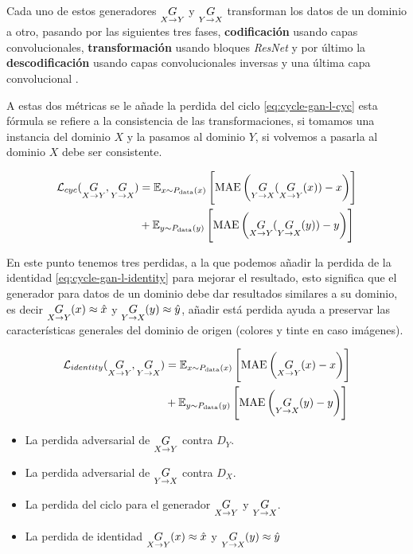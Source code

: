 Cada uno de estos generadores ${\underset{X\rightarrow{}Y}{G}}$ y ${\underset{Y\rightarrow{}X}{G}}$ transforman los datos de un dominio a otro, pasando por las siguientes tres fases, \textbf{codificación} usando capas convolucionales, \textbf{transformación} usando bloques \textit{ResNet} y por último la \textbf{descodificación} usando capas convolucionales inversas y una última capa convolucional \cite{CycleGAN-blog}.

A estas dos métricas se le añade la perdida del ciclo \ref{eq:cycle-gan-l-cyc} esta fórmula se refiere a la consistencia de las transformaciones, si tomamos una instancia del dominio ${X}$ y la pasamos al dominio ${Y}$, si volvemos a pasarla al dominio ${X}$ debe ser consistente.

\begin{equation}
    \begin{split}
        \mathcal{L}_{cyc} (\underset{X\rightarrow{}Y}{G},\underset{Y\rightarrow{}X}{G})
        & = \mathbb{E}_{x\sim{}P_{\text{data}}(x)} \left[{\mathrm{MAE}\left(\underset{Y\rightarrow{}X}{G}(\underset{X\rightarrow{}Y}{G}(x)) - x\right)}\right] \\
        & + \mathbb{E}_{y\sim{}P_{\text{data}}(y)} \left[{\mathrm{MAE}\left(\underset{X\rightarrow{}Y}{G}(\underset{Y\rightarrow{}X}{G}(y)) - y\right)}\right] \\
    \end{split}
    \label{eq:cycle-gan-l-cyc}
\end{equation}

En este punto tenemos tres perdidas, a la que podemos añadir la perdida de la identidad \ref{eq:cycle-gan-l-identity} para mejorar el resultado, esto significa que el generador para datos de un dominio debe dar resultados similares a su dominio, es decir ${\underset{X\rightarrow{}Y}{G}(x) \approx \hat{x}}$ y ${\underset{Y\rightarrow{}X}{G}(y) \approx \hat{y}}$, añadir está perdida ayuda a preservar las características generales del dominio de origen (colores y tinte en caso imágenes).

\begin{equation}
    \begin{split}
        \mathcal{L}_{identity} (\underset{X\rightarrow{}Y}{G},\underset{Y\rightarrow{}X}{G})
        & = \mathbb{E}_{x\sim{}P_{\text{data}}(x)} \left[{\mathrm{MAE}\left(\underset{X\rightarrow{}Y}{G}(x) - x\right)}\right] \\
        & + \mathbb{E}_{y\sim{}P_{\text{data}}(y)} \left[{\mathrm{MAE}\left(\underset{Y\rightarrow{}X}{G}(y) - y\right)}\right] \\
    \end{split}
    \label{eq:cycle-gan-l-identity}
\end{equation}

\begin{itemize}
    \item La perdida adversarial de ${\underset{X\rightarrow{}Y}{G}}$ contra ${D_{Y}}$.
    \item La perdida adversarial de ${\underset{Y\rightarrow{}X}{G}}$ contra ${D_{X}}$.
    \item La perdida del ciclo para el generador ${\underset{X\rightarrow{}Y}{G}}$ y ${\underset{Y\rightarrow{}X}{G}}$.
    \item La perdida de identidad ${\underset{X\rightarrow{}Y}{G}(x) \approx \hat{x}}$ y ${\underset{Y\rightarrow{}X}{G}(y) \approx \hat{y}}$
\end{itemize}

